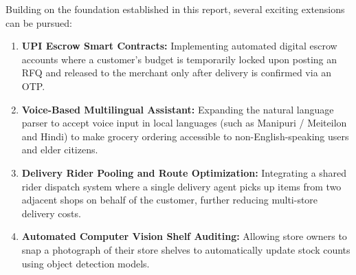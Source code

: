 Building on the foundation established in this report, several exciting extensions can be pursued:
\begin{enumerate}
    \item \textbf{UPI Escrow Smart Contracts:} Implementing automated digital escrow accounts where a customer's budget is temporarily locked upon posting an RFQ and released to the merchant only after delivery is confirmed via an OTP.
    \item \textbf{Voice-Based Multilingual Assistant:} Expanding the natural language parser to accept voice input in local languages (such as Manipuri / Meiteilon and Hindi) to make grocery ordering accessible to non-English-speaking users and elder citizens.
    \item \textbf{Delivery Rider Pooling and Route Optimization:} Integrating a shared rider dispatch system where a single delivery agent picks up items from two adjacent shops on behalf of the customer, further reducing multi-store delivery costs.
    \item \textbf{Automated Computer Vision Shelf Auditing:} Allowing store owners to snap a photograph of their store shelves to automatically update stock counts using object detection models.
\end{enumerate}
